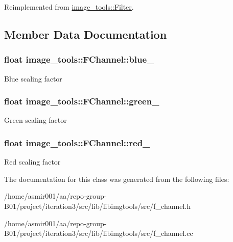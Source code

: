 Reimplemented from \hyperlink{classimage__tools_1_1Filter_afd5d1be5736e343077d331896d4130d9}{image\+\_\+tools\+::\+Filter}.



\subsection{Member Data Documentation}
\subsubsection[{\texorpdfstring{blue\+\_\+}{blue_}}]{\setlength{\rightskip}{0pt plus 5cm}float image\+\_\+tools\+::\+F\+Channel\+::blue\+\_\+\hspace{0.3cm}{\ttfamily [private]}}\hypertarget{classimage__tools_1_1FChannel_a3eb08bcf47005e1672b4516b0c75d7a9}{}\label{classimage__tools_1_1FChannel_a3eb08bcf47005e1672b4516b0c75d7a9}
Blue scaling factor 
\subsubsection[{\texorpdfstring{green\+\_\+}{green_}}]{\setlength{\rightskip}{0pt plus 5cm}float image\+\_\+tools\+::\+F\+Channel\+::green\+\_\+\hspace{0.3cm}{\ttfamily [private]}}\hypertarget{classimage__tools_1_1FChannel_a42ef11eef9bfad14df5007959047ccc6}{}\label{classimage__tools_1_1FChannel_a42ef11eef9bfad14df5007959047ccc6}
Green scaling factor 
\subsubsection[{\texorpdfstring{red\+\_\+}{red_}}]{\setlength{\rightskip}{0pt plus 5cm}float image\+\_\+tools\+::\+F\+Channel\+::red\+\_\+\hspace{0.3cm}{\ttfamily [private]}}\hypertarget{classimage__tools_1_1FChannel_a6d2b5a5e5bffb3673df6191cf642f337}{}\label{classimage__tools_1_1FChannel_a6d2b5a5e5bffb3673df6191cf642f337}
Red scaling factor 

The documentation for this class was generated from the following files\+:\begin{DoxyCompactItemize}
\item 
/home/asmir001/aa/repo-\/group-\/\+B01/project/iteration3/src/lib/libimgtools/src/f\+\_\+channel.\+h\item 
/home/asmir001/aa/repo-\/group-\/\+B01/project/iteration3/src/lib/libimgtools/src/f\+\_\+channel.\+cc\end{DoxyCompactItemize}
